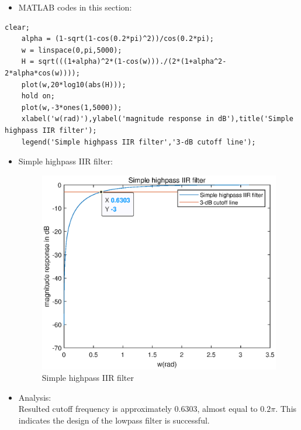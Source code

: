 \documentclass[onecolumn,oneside]{SUSTechHomework}
\begin{document}
\begin{itemize}
    \item MATLAB codes in this section:
\end{itemize}
\begin{lstlisting}[title=\textbf{q6\_4.m}]
    clear;
    alpha = (1-sqrt(1-cos(0.2*pi)^2))/cos(0.2*pi);
    w = linspace(0,pi,5000);
    H = sqrt(((1+alpha)^2*(1-cos(w)))./(2*(1+alpha^2-2*alpha*cos(w))));
    plot(w,20*log10(abs(H)));
    hold on;
    plot(w,-3*ones(1,5000));
    xlabel('w(rad)'),ylabel('magnitude response in dB'),title('Simple highpass IIR filter');
    legend('Simple highpass IIR filter','3-dB cutoff line'); 
\end{lstlisting}
\begin{itemize}
    \item Simple highpass IIR filter:
\begin{figure}[H]
\centering
\includegraphics[width=170mm]{pictures/iir.eps}
\caption{Simple highpass IIR filter}
\end{figure}
    \item Analysis:\\
    Resulted cutoff frequency is approximately 0.6303, almost equal to $0.2\pi$. This indicates
    the design of the lowpass filter is successful.
\end{itemize}
\end{document}
